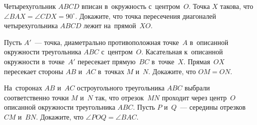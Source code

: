 \begin{problems}
\item
Четырехугольник $ABCD$ вписан в~окружность с~центром~$O$.
Точка $X$ такова, что $\angle BAX = \angle CDX = 90^{\circ}$.
Докажите, что точка пересечения диагоналей четырехугольника $ABCD$ лежит
на~прямой~$XO$.

\item
Пусть $A'$~--- точка, диаметрально противоположная точке~$A$ в~описанной
окружности треугольника $ABC$ с~центром~$O$.
Касательная к~описанной окружности в~точке~$A'$ пересекает прямую~$BC$
в~точке~$X$.
Прямая~$OX$ пересекает стороны $AB$ и~$AC$ в~точках $M$ и~$N$.
Докажите, что $OM = ON$.

\item
На~сторонах $AB$ и~$AC$ остроугольного треугольника $ABC$ выбрали
соответственно точки $M$ и~$N$ так, что отрезок~$MN$ проходит через центр~$O$
описанной окружности треугольника $ABC$.
Пусть $P$ и~$Q$~--- середины отрезков $CM$ и~$BN$.
Докажите, что $\angle POQ = \angle BAC$.





\end{problems}

